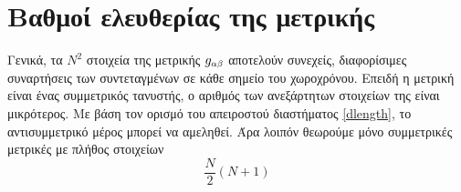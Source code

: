 \section{Βαθμοί ελευθερίας της μετρικής}
Γενικά, τα $N^2$ στοιχεία της μετρικής $\g{\alpha}{\beta}$ αποτελούν συνεχείς, διαφορίσιμες συναρτήσεις των συντεταγμένων σε κάθε σημείο του χωροχρόνου. Επειδή η μετρική είναι ένας συμμετρικός τανυστής, ο αριθμός των ανεξάρτητων στοιχείων της είναι μικρότερος. Με βάση τον ορισμό του απειροστού διαστήματος \eqref{dlength}, το αντισυμμετρικό μέρος μπορεί να αμεληθεί. %
Άρα λοιπόν θεωρούμε μόνο συμμετρικές μετρικές με πλήθος στοιχείων
\begin{equation}\label{smetricdof}
    \frac{N}{2}\left( N+1 \right)
\end{equation}

